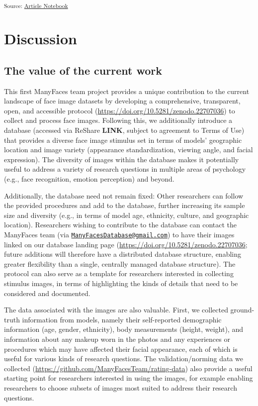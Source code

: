 \documentclass[
  letterpaper,
  DIV=11,
  numbers=noendperiod]{scrartcl}
\begin{document}
\textsubscript{Source:
\href{https://ManyFacesTeam.github.io/paper/index.qmd.html}{Article
Notebook}}

\section{Discussion}\label{discussion}

\subsection{The value of the current
work}\label{the-value-of-the-current-work}

This first ManyFaces team project provides a unique contribution to the
current landscape of face image datasets by developing a comprehensive,
transparent, open, and accessible protocol
(\url{https://doi.org/10.5281/zenodo.22707036}) to collect and process
face images. Following this, we additionally introduce a database
(accessed via ReShare \textbf{LINK}, subject to agreement to Terms of
Use) that provides a diverse face image stimulus set in terms of models'
geographic location and image variety (appearance standardization,
viewing angle, and facial expression). The diversity of images within
the database makes it potentially useful to address a variety of
research questions in multiple areas of psychology (e.g., face
recognition, emotion perception) and beyond.

Additionally, the database need not remain fixed: Other researchers can
follow the provided procedures and add to the database, further
increasing its sample size and diversity (e.g., in terms of model age,
ethnicity, culture, and geographic location). Researchers wishing to
contribute to the database can contact the ManyFaces team (via
\href{mailto:ManyFacesDatabase@gmail.com}{\nolinkurl{ManyFacesDatabase@gmail.com}})
to have their images linked on our database landing page
(\url{https://doi.org/10.5281/zenodo.22707036}; future additions will
therefore have a distributed database structure, enabling greater
flexibility than a single, centrally managed database structure). The
protocol can also serve as a template for researchers interested in
collecting stimulus images, in terms of highlighting the kinds of
details that need to be considered and documented.

The data associated with the images are also valuable. First, we
collected ground-truth information from models, namely their
self-reported demographic information (age, gender, ethnicity), body
measurements (height, weight), and information about any makeup worn in
the photos and any experiences or procedures which may have affected
their facial appearance, each of which is useful for various kinds of
research questions. The validation/norming data we collected
(\url{https://github.com/ManyFacesTeam/rating-data}) also provide a
useful starting point for researchers interested in using the images,
for example enabling researchers to choose subsets of images most suited
to address their research questions.
\end{document}

